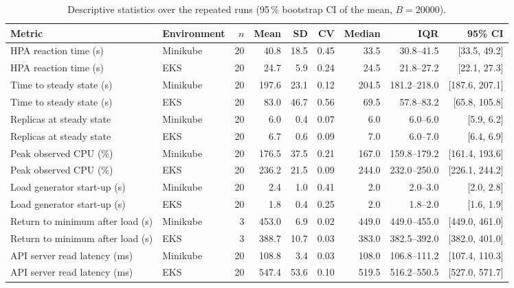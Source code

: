 \begin{table}[!t]
\centering
\caption{Descriptive statistics over the repeated runs (95\,\% bootstrap CI of the mean, $B=20000$).}
\label{tab:descritivas}
\footnotesize
\begin{tabular}{@{}llrrrrrrr@{}}
\toprule
\textbf{Metric} & \textbf{Environment} & $n$ & \textbf{Mean} & \textbf{SD} & \textbf{CV} & \textbf{Median} & \textbf{IQR} & \textbf{95\% CI}\\
\midrule
HPA reaction time (s) & Minikube & 20 & 40.8 & 18.5 & 0.45 & 33.5 & 30.8--41.5 & [33.5, 49.2]\\
HPA reaction time (s) & EKS & 20 & 24.7 & 5.9 & 0.24 & 24.5 & 21.8--27.2 & [22.1, 27.3]\\
\addlinespace
Time to steady state (s) & Minikube & 20 & 197.6 & 23.1 & 0.12 & 204.5 & 181.2--218.0 & [187.6, 207.1]\\
Time to steady state (s) & EKS & 20 & 83.0 & 46.7 & 0.56 & 69.5 & 57.8--83.2 & [65.8, 105.8]\\
\addlinespace
Replicas at steady state & Minikube & 20 & 6.0 & 0.4 & 0.07 & 6.0 & 6.0--6.0 & [5.9, 6.2]\\
Replicas at steady state & EKS & 20 & 6.7 & 0.6 & 0.09 & 7.0 & 6.0--7.0 & [6.4, 6.9]\\
\addlinespace
Peak observed CPU (\%) & Minikube & 20 & 176.5 & 37.5 & 0.21 & 167.0 & 159.8--179.2 & [161.4, 193.6]\\
Peak observed CPU (\%) & EKS & 20 & 236.2 & 21.5 & 0.09 & 244.0 & 232.0--250.0 & [226.1, 244.2]\\
\addlinespace
Load generator start-up (s) & Minikube & 20 & 2.4 & 1.0 & 0.41 & 2.0 & 2.0--3.0 & [2.0, 2.8]\\
Load generator start-up (s) & EKS & 20 & 1.8 & 0.4 & 0.25 & 2.0 & 1.8--2.0 & [1.6, 1.9]\\
\addlinespace
Return to minimum after load (s) & Minikube & 3 & 453.0 & 6.9 & 0.02 & 449.0 & 449.0--455.0 & [449.0, 461.0]\\
Return to minimum after load (s) & EKS & 3 & 388.7 & 10.7 & 0.03 & 383.0 & 382.5--392.0 & [382.0, 401.0]\\
\addlinespace
API server read latency (ms) & Minikube & 20 & 108.8 & 3.4 & 0.03 & 108.0 & 106.8--111.2 & [107.4, 110.3]\\
API server read latency (ms) & EKS & 20 & 547.4 & 53.6 & 0.10 & 519.5 & 516.2--550.5 & [527.0, 571.7]\\

\end{tabular}
\end{table}
